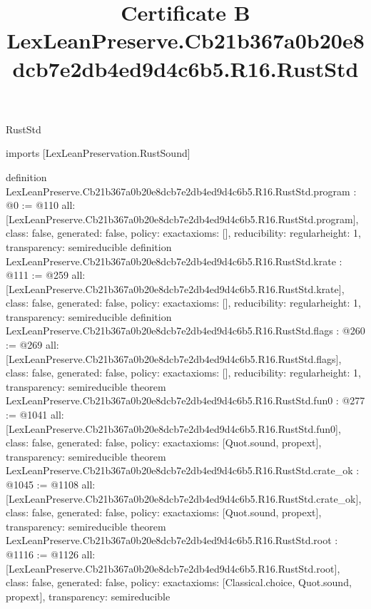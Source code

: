 \begin{lexlean}{RustStd}
\title{Certificate B LexLeanPreserve.Cb21b367a0b20e8dcb7e2db4ed9d4c6b5.R16.RustStd}
\begin{coremodule}
imports [LexLeanPreservation.RustSound]

definition LexLeanPreserve.Cb21b367a0b20e8dcb7e2db4ed9d4c6b5.R16.RustStd.program : @0 := @110 {
  all: [LexLeanPreserve.Cb21b367a0b20e8dcb7e2db4ed9d4c6b5.R16.RustStd.program],
  class: false,
  generated: false,
  policy: exact{axioms: []},
  reducibility: regular{height: 1},
  transparency: semireducible
}
definition LexLeanPreserve.Cb21b367a0b20e8dcb7e2db4ed9d4c6b5.R16.RustStd.krate : @111 := @259 {
  all: [LexLeanPreserve.Cb21b367a0b20e8dcb7e2db4ed9d4c6b5.R16.RustStd.krate],
  class: false,
  generated: false,
  policy: exact{axioms: []},
  reducibility: regular{height: 1},
  transparency: semireducible
}
definition LexLeanPreserve.Cb21b367a0b20e8dcb7e2db4ed9d4c6b5.R16.RustStd.flags : @260 := @269 {
  all: [LexLeanPreserve.Cb21b367a0b20e8dcb7e2db4ed9d4c6b5.R16.RustStd.flags],
  class: false,
  generated: false,
  policy: exact{axioms: []},
  reducibility: regular{height: 1},
  transparency: semireducible
}
theorem LexLeanPreserve.Cb21b367a0b20e8dcb7e2db4ed9d4c6b5.R16.RustStd.fun0 : @277 := @1041 {
  all: [LexLeanPreserve.Cb21b367a0b20e8dcb7e2db4ed9d4c6b5.R16.RustStd.fun0],
  class: false,
  generated: false,
  policy: exact{axioms: [Quot.sound, propext]},
  transparency: semireducible
}
theorem LexLeanPreserve.Cb21b367a0b20e8dcb7e2db4ed9d4c6b5.R16.RustStd.crate_ok : @1045 := @1108 {
  all: [LexLeanPreserve.Cb21b367a0b20e8dcb7e2db4ed9d4c6b5.R16.RustStd.crate_ok],
  class: false,
  generated: false,
  policy: exact{axioms: [Quot.sound, propext]},
  transparency: semireducible
}
theorem LexLeanPreserve.Cb21b367a0b20e8dcb7e2db4ed9d4c6b5.R16.RustStd.root : @1116 := @1126 {
  all: [LexLeanPreserve.Cb21b367a0b20e8dcb7e2db4ed9d4c6b5.R16.RustStd.root],
  class: false,
  generated: false,
  policy: exact{axioms: [Classical.choice, Quot.sound, propext]},
  transparency: semireducible
}


\end{coremodule}
\end{lexlean}
